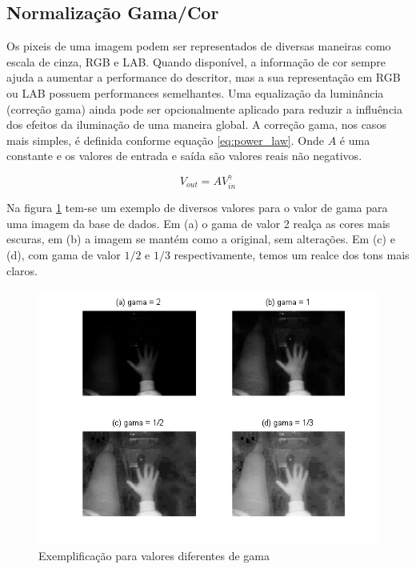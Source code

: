 
\subsection{Normalização Gama/Cor}

Os pixeis de uma imagem podem ser representados de diversas maneiras como escala de cinza, RGB e LAB. Quando disponível, a informação de cor sempre ajuda a aumentar a performance do descritor, mas a sua representação em RGB ou LAB possuem performances semelhantes.
Uma equalização da luminância (correção gama) ainda pode ser opcionalmente aplicado para reduzir a influência dos efeitos da iluminação de uma maneira global. A correção gama, nos casos mais simples, é definida conforme equação \ref{eq:power_law}. Onde \(A\) é uma constante e os valores de entrada e saída são valores reais não negativos. \cite{dalal2005histograms}

\begin{equation}
V_{out} = AV_{in}^\gamma
\label{eq:power_law}
\end{equation}

Na figura \ref{fig:gamma_correction} tem-se um exemplo de diversos valores para o valor de gama para uma imagem da base de dados. Em (a) o gama de valor 2 realça as cores mais escuras, em (b) a imagem se mantém como a original, sem alterações. Em (c) e (d), com gama de valor \(1/2\) e \(1/3\) respectivamente, temos um realce dos tons mais claros.

\begin{figure}[ht!]
\centering
  \includegraphics[scale=0.8]{image/gamma_correction.png}
  \caption{Exemplificação para valores diferentes de gama}
  \label{fig:gamma_correction}
\end{figure}

